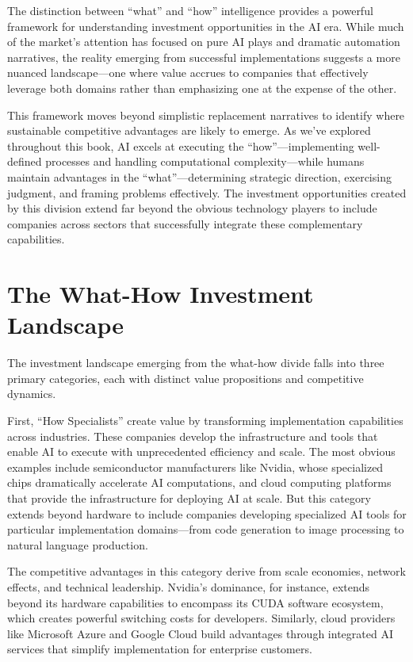 \documentclass[
  Letterpaper,
]{scrbook}
\begin{document}
The distinction between ``what'' and ``how'' intelligence provides a
powerful framework for understanding investment opportunities in the AI
era. While much of the market's attention has focused on pure AI plays
and dramatic automation narratives, the reality emerging from successful
implementations suggests a more nuanced landscape---one where value
accrues to companies that effectively leverage both domains rather than
emphasizing one at the expense of the other.

This framework moves beyond simplistic replacement narratives to
identify where sustainable competitive advantages are likely to emerge.
As we've explored throughout this book, AI excels at executing the
``how''---implementing well-defined processes and handling computational
complexity---while humans maintain advantages in the
``what''---determining strategic direction, exercising judgment, and
framing problems effectively. The investment opportunities created by
this division extend far beyond the obvious technology players to
include companies across sectors that successfully integrate these
complementary capabilities.

\section{The What-How Investment
Landscape}\label{the-what-how-investment-landscape}

The investment landscape emerging from the what-how divide falls into
three primary categories, each with distinct value propositions and
competitive dynamics.

First, ``How Specialists'' create value by transforming implementation
capabilities across industries. These companies develop the
infrastructure and tools that enable AI to execute with unprecedented
efficiency and scale. The most obvious examples include semiconductor
manufacturers like Nvidia, whose specialized chips dramatically
accelerate AI computations, and cloud computing platforms that provide
the infrastructure for deploying AI at scale. But this category extends
beyond hardware to include companies developing specialized AI tools for
particular implementation domains---from code generation to image
processing to natural language production.

The competitive advantages in this category derive from scale economies,
network effects, and technical leadership. Nvidia's dominance, for
instance, extends beyond its hardware capabilities to encompass its CUDA
software ecosystem, which creates powerful switching costs for
developers. Similarly, cloud providers like Microsoft Azure and Google
Cloud build advantages through integrated AI services that simplify
implementation for enterprise customers.
\end{document}
